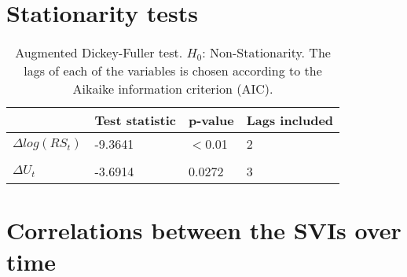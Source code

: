 \section{Stationarity tests}\label{stationarity}

\begin{table}[H]
\begin{tabularx}{\textwidth}{@{}XXXX@{}}
\toprule
& \textbf{Test statistic} & \textbf{p-value} & \textbf{Lags included} \\ 
\midrule
$\Delta log(RS_t)$ & -9.3641 & $<$0.01 & 2 \\ \\

$\Delta U_t$ & -3.6914 & 0.0272 & 3 \\
\bottomrule
\end{tabularx}
\caption{Augmented Dickey-Fuller test. $H_0$: Non-Stationarity. The lags of each of the variables is chosen according to the Aikaike information criterion (AIC).}
\label{adf}
\end{table}
\newpage
\section{Correlations between the SVIs over time}\label{correlation_svi}

